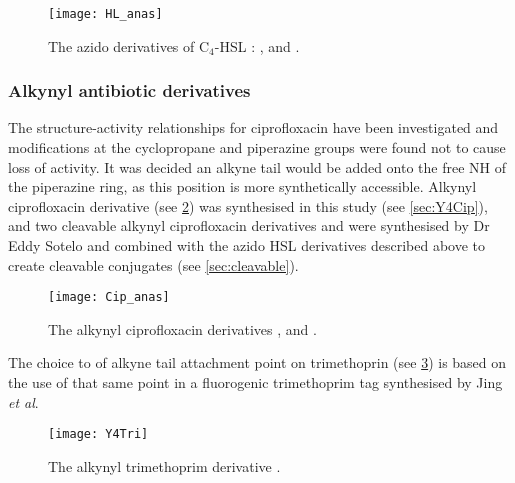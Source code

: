 \begin{figure}[H]
	\begin{center}
		\texttt{[image: HL\_anas]}
		\caption{The azido derivatives of C$_4$-HSL :  ,  and . \label{fig:HL_anas}}
	\end{center}
\end{figure}


\subsubsection{Alkynyl antibiotic derivatives}


The structure-activity relationships for ciprofloxacin have been investigated \cite{Renau1996} and modifications at the cyclopropane and piperazine groups were found not to cause loss of activity. It was decided an alkyne tail would be added onto the free NH of the piperazine ring, as this position is more synthetically accessible. 
Alkynyl ciprofloxacin derivative  (see \ref{fgr:Cip_anas}) was synthesised in this study (see \ref{sec:Y4Cip}), and two cleavable alkynyl ciprofloxacin derivatives  and  were synthesised by Dr Eddy Sotelo and combined with the azido HSL derivatives described above to create cleavable conjugates (see \ref{sec:cleavable}).


\begin{figure}[H]
	\begin{center}
		\texttt{[image: Cip\_anas]}
		\caption{The alkynyl ciprofloxacin derivatives ,  and . \label{fgr:Cip_anas}}
	\end{center}
\end{figure}

The choice to of alkyne tail attachment point on trimethoprin  (see \ref{fgr:Y4Tri}) is based on the use of that same point in a fluorogenic trimethoprim tag synthesised by Jing \textit{et al}\cite{Jing2013}.

\begin{figure}[H]
	\begin{center}
		\texttt{[image: Y4Tri]}
		\caption{The alkynyl trimethoprim derivative . \label{fgr:Y4Tri}}
	\end{center}
\end{figure}

